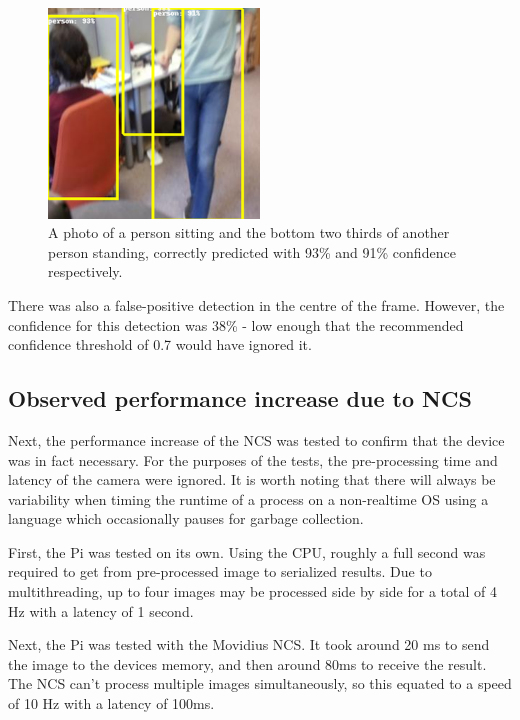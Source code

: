 \begin{figure}[h!]
  \centering
  \includegraphics[width=0.5\textwidth]{methodology/box_around_people_hard}
  \caption{{\label{fig:box_around_people_hard}A photo of a person sitting and the bottom two thirds of another person standing, correctly predicted with 93\% and 91\% confidence respectively.}}
\end{figure}

There was also a false-positive detection in the centre of the frame. However, the confidence for this detection was 38\% - low enough that the recommended confidence threshold of 0.7 would have ignored it.%

\subsection{Observed performance increase due to NCS}\label{ssec:meth_nn_performance_increase}
Next, the performance increase of the NCS was tested to confirm that the device was in fact necessary. For the purposes of the tests, the pre-processing time and latency of the camera were ignored. It is worth noting that there will always be variability when timing the runtime of a process on a non-realtime OS using a language which occasionally pauses for garbage collection.

First, the Pi was tested on its own. Using the CPU, roughly a full second was required to get from pre-processed image to serialized results. Due to multithreading, up to four images may be processed side by side for a total of 4 Hz with a latency of 1 second.

Next, the Pi was tested with the Movidius NCS. It took around 20 ms to send the image to the devices memory, and then around 80ms to receive the result. The NCS can't process multiple images simultaneously, so this equated to a speed of 10 Hz with a latency of 100ms.

